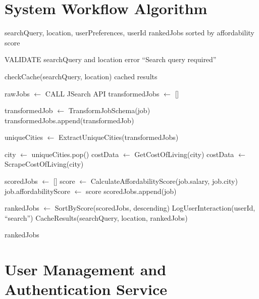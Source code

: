 \section{System Workflow Algorithm}

\begin{algorithm}
\caption{Job Search and Affordability Scoring Workflow}
\label{alg:workflow}
\begin{algorithmic}[1]
\Require searchQuery, location, userPreferences, userId
\Ensure rankedJobs sorted by affordability score

\State VALIDATE searchQuery and location
    \State \Return error ``Search query required''
\EndIf

\State checkCache(searchQuery, location)
    \State \Return cached results
\EndIf

\State rawJobs $\leftarrow$ CALL JSearch API
\State transformedJobs $\leftarrow$ []

    \State transformedJob $\leftarrow$ TransformJobSchema(job)
    \State transformedJobs.append(transformedJob)
\EndFor

\State uniqueCities $\leftarrow$ ExtractUniqueCities(transformedJobs)

    \State city $\leftarrow$ uniqueCities.pop()
    \State costData $\leftarrow$ GetCostOfLiving(city)
        \State costData $\leftarrow$ ScrapeCostOfLiving(city)
    \EndIf
\EndWhile

\State scoredJobs $\leftarrow$ []
    \State score $\leftarrow$ CalculateAffordabilityScore(job.salary, job.city)
    \State job.affordabilityScore $\leftarrow$ score
    \State scoredJobs.append(job)
\EndFor

\State rankedJobs $\leftarrow$ SortByScore(scoredJobs, descending)
\State LogUserInteraction(userId, ``search'')
\State CacheResults(searchQuery, location, rankedJobs)

\State \Return rankedJobs
\end{algorithmic}
\end{algorithm}

\section{User Management and Authentication Service}

